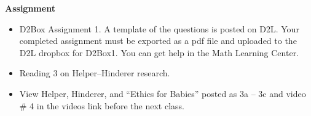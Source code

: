  {\bf Assignment}
 \begin{itemize}
 \item D2Box Assignment 1. 
  A template of the questions is posted on D2L.
  Your completed assignment must be exported as a pdf file and uploaded
  to the D2L dropbox for D2Box1. You can get help in the Math Learning Center.

 \item Reading 3 on Helper--Hinderer research. \\
 \item View Helper, Hinderer, and ``Ethics for Babies'' posted as 3a --
   3c  and video \# 4 in the videos link before  the next class.
 \end{itemize}

